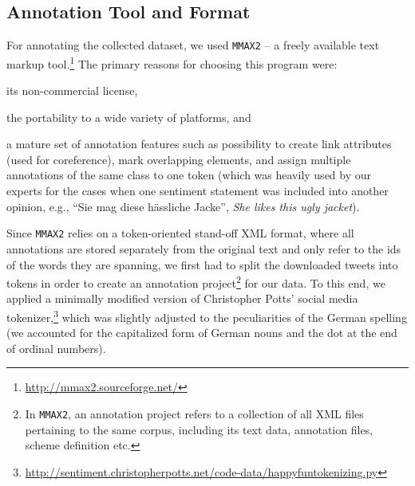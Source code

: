 \subsection{Annotation Tool and Format}\label{subsec:snt:tformat}

For annotating the collected dataset, we used \texttt{MMAX2} -- a
freely available text markup
tool.\footnote{\url{http://mmax2.sourceforge.net/}} The primary
reasons for choosing this program were:
\begin{inparaenum}
 \item its non-commercial license,
 \item the portability to a wide variety of platforms, and
 \item a mature set of annotation features such as possibility to
   create link attributes (used for coreference), mark overlapping
   elements, and assign multiple annotations of the same class to one
   token (which was heavily used by our experts for the cases when one
   sentiment statement was included into another opinion, e.g., ``Sie
   mag diese h\"assliche Jacke'', \emph{She likes this ugly jacket}).
\end{inparaenum}

Since \texttt{MMAX2} relies on a token-oriented stand-off XML format,
where all annotations are stored separately from the original text and
only refer to the ids of the words they are spanning, we first had to
split the downloaded tweets into tokens in order to create an
annotation project\footnote{In \texttt{MMAX2}, an annotation project
  refers to a collection of all XML files pertaining to the same
  corpus, including its text data, annotation files, scheme definition
  etc.} for our data.  To this end, we applied a minimally modified
version of Christopher Potts' social media
tokenizer,\footnote{\url{http://sentiment.christopherpotts.net/code-data/happyfuntokenizing.py}}
which was slightly adjusted to the peculiarities of the German
spelling (we accounted for the capitalized form of German nouns and
the dot at the end of ordinal numbers).

